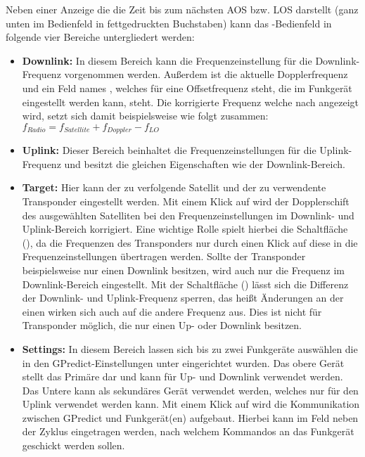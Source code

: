 Neben einer Anzeige die die Zeit bis zum nächsten \ac{AOS} bzw. \ac{LOS} darstellt (ganz unten im Bedienfeld in fettgedruckten Buchstaben) kann das -Bedienfeld in folgende vier Bereiche untergliedert werden:

\begin{itemize}
	\parskip0pt
	\item \textbf{Downlink:} In diesem Bereich kann die Frequenzeinstellung für die Downlink-Frequenz vorgenommen werden. Außerdem ist die aktuelle Dopplerfrequenz und ein Feld names , welches für eine Offsetfrequenz steht, die im Funkgerät eingestellt werden kann, steht. Die korrigierte Frequenz welche nach  angezeigt wird, setzt sich damit beispielsweise wie folgt zusammen: $f_{Radio} = f_{Satellite} + f_{Doppler} - f_{LO}$
	\item \textbf{Uplink:} Dieser Bereich beinhaltet die Frequenzeinstellungen für die Uplink-Frequenz und besitzt die gleichen Eigenschaften wie der Downlink-Bereich.
	\item \textbf{Target:} Hier kann der zu verfolgende Satellit und der zu verwendente Transponder eingestellt werden. Mit einem Klick auf  wird der Dopplerschift des ausgewählten Satelliten bei den Frequenzeinstellungen im Downlink- und Uplink-Bereich korrigiert. Eine wichtige Rolle spielt hierbei die Schaltfläche  (), da die Frequenzen des Transponders nur durch einen Klick auf diese in die Frequenzeinstellungen übertragen werden. Sollte der Transponder beispielsweise nur einen Downlink besitzen, wird auch nur die Frequenz im Downlink-Bereich eingestellt.\clearpage
	Mit der Schaltfläche  () lässt sich die Differenz der Downlink- und Uplink-Frequenz sperren, das heißt Änderungen an der einen wirken sich auch auf die andere Frequenz aus. Dies ist nicht für Transponder möglich, die nur einen Up- oder Downlink besitzen.
	\item \textbf{Settings:} In diesem Bereich lassen sich bis zu zwei Funkgeräte auswählen die in den GPredict-Einstellungen unter  eingerichtet wurden. Das obere Gerät stellt das Primäre dar und kann für Up- und Downlink verwendet werden. Das Untere kann als sekundäres Gerät verwendet werden, welches nur für den Uplink verwendet werden kann. Mit einem Klick auf  wird die Kommunikation zwischen GPredict und Funkgerät(en) aufgebaut. Hierbei kann im Feld neben  der Zyklus eingetragen werden, nach welchem Kommandos an das Funkgerät geschickt werden sollen.
\end{itemize}

